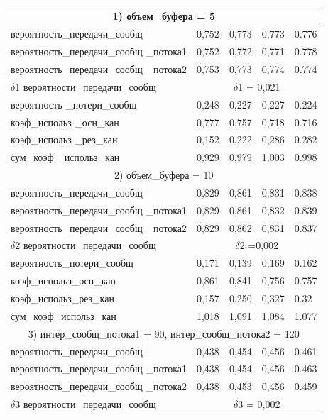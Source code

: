 \begin{longtable} {
	|p{}
	|p{}
	|p{}
	|p{}
	|p{}
	|}
	\multicolumn{5}{|c|}{1) объем\_буфера = 5} \\ \hline
	вероятность\_передачи\_сообщ & 0,752 & 0,773 & 0,773 & 0.776 \\ \hline
	вероятность\_передачи\_сообщ \_потока1 & 0,752 & 0,772
		& 0,771 & 0.778\\ \hline
	вероятность\_передачи\_сообщ \_потока2 & 0,753 & 0,773
		& 0,774 & 0.774\\ \hline
	$\delta$1 вероятности\_передачи\_сообщ &
		\multicolumn{4}{|c|}{$\delta$1 = 0,021} \\ \hline
	вероятность \_потери\_сообщ & 0,248 & 0,227 & 0,227 & 0.224 \\ \hline
	коэф\_использ \_осн\_кан & 0,777 & 0,757 & 0,718 & 0.716 \\ \hline
	коэф\_использ \_рез\_кан & 0,152 & 0,222 & 0,286 & 0.282 \\ \hline
	сум\_коэф \_использ\_кан & 0,929 & 0,979 & 1,003 & 0.998 \\ \hline
	\multicolumn{5}{|c|}{2) объем\_буфера = 10} \\ \hline
	вероятность\_передачи\_сообщ & 0,829 & 0,861 & 0,831 & 0.838 \\ \hline
	вероятность\_передачи\_сообщ \_потока1 & 0,829 & 0,861
		& 0,832 & 0.839\\ \hline
	вероятность\_передачи\_сообщ \_потока2 & 0,829 & 0,862
		& 0,831 & 0.837 \\ \hline
	$\delta$2 вероятности\_передачи\_сообщ &
		\multicolumn{4}{|c|}{$\delta$2 =0,002} \\ \hline
	вероятность\_потери\_сообщ & 0,171 & 0,139 & 0,169 & 0.162 \\ \hline
	коэф\_использ\_осн\_кан & 0,861 & 0,841 & 0,756 & 0.757 \\ \hline
	коэф\_использ\_рез\_кан & 0,157 & 0,250 & 0,327 & 0.32 \\ \hline
	сум\_коэф\_использ\_кан & 1,018 & 1,091 & 1,084 & 1.077 \\ \hline
	\multicolumn{5}{|c|}{3) интер\_сообщ\_потока1 = 90,
		интер\_сообщ\_потока2 = 120} \\ \hline
	вероятность\_передачи\_сообщ & 0,438 & 0,454 & 0,456 & 0.461 \\ \hline
	вероятность\_передачи\_сообщ \_потока1 & 0,438 & 0,454
		& 0,456 & 0.463 \\ \hline
	вероятность\_передачи\_сообщ \_потока2 & 0,438 & 0,453
		& 0,456 & 0.459 \\ \hline
	$\delta$3 вероятности\_передачи\_сообщ &
		\multicolumn{4}{|c|}{$\delta$3 = 0,002} \\ \hline

\end{longtable}
